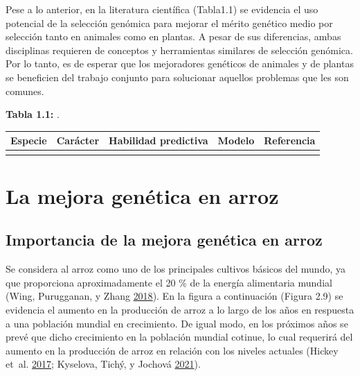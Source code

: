 \documentclass[11pt,spanish,a4paper,oneside,]{book} %
\begin{document}
Pese a lo anterior, en la literatura científica (Tabla1.1) se evidencia el uso potencial de la selección genómica para mejorar el mérito genético medio por selección tanto en animales como en plantas. A pesar de sus diferencias, ambas disciplinas requieren de conceptos y herramientas similares de selección genómica. Por lo tanto, es de esperar que los mejoradores genéticos de animales y de plantas se beneficien del trabajo conjunto para solucionar aquellos problemas que les son comunes.

\begin{center}
\textbf{Tabla 1.1:} .

\end{center}

\captionsetup[table]{labelformat=empty,skip=1pt}
\begin{longtable}{lllll}
\toprule
Especie & Carácter & Habilidad predictiva & Modelo & Referencia \\ 
\midrule
 &  &  &  &  \\ 
 \bottomrule
\end{longtable}

\hypertarget{la-mejora-genuxe9tica-en-arroz}{%
\section{La mejora genética en arroz}\label{la-mejora-genuxe9tica-en-arroz}}

\hypertarget{importancia-de-la-mejora-genuxe9tica-en-arroz}{%
\subsection{Importancia de la mejora genética en arroz}\label{importancia-de-la-mejora-genuxe9tica-en-arroz}}

Se considera al arroz como uno de los principales cultivos básicos del mundo, ya que proporciona aproximadamente el 20 \% de la energía alimentaria mundial (Wing, Purugganan, y Zhang \protect\hyperlink{ref-cite:55}{2018}). En la figura a continuación (Figura 2.9) se evidencia el aumento en la producción de arroz a lo largo de los años en respuesta a una población mundial en crecimiento. De igual modo, en los próximos años se prevé que dicho crecimiento en la población mundial cotinue, lo cual requerirá del aumento en la producción de arroz en relación con los niveles actuales (Hickey et~al. \protect\hyperlink{ref-cite:44}{2017}; Kyselova, Tichý, y Jochová \protect\hyperlink{ref-cite:32}{2021}).
\end{document}
